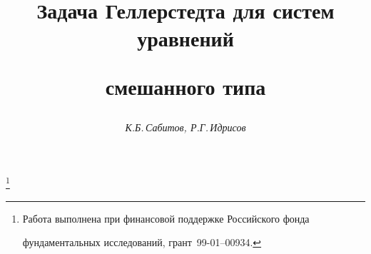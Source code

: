 




%







\newcommand{\up}[2]{\overset{#1}{#2}{}}


\newcommand{\const}{\operatorname{const}}


\newcommand{\sgn}{\operatorname{sgn}}


\newcommand{\re}{\operatorname{Re}}


\newcommand{\im}{\operatorname{Im}}


\newcommand{\tts}[1]{}







\setcounter{page}{22}















\author{\it К.Б.\,Сабитов, Р.Г.\,Идрисов}




\title{Задача Геллерстедта для систем уравнений


смешанного типа}


\thanks{Работа выполнена при финансовой поддержке Российского фонда


фундаментальных исследований, грант \No\,99-01--00934.}





\date{}




